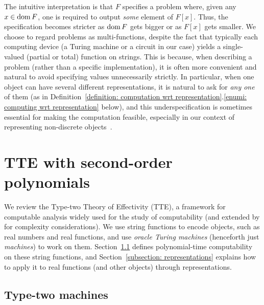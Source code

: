 \documentclass[conference]{IEEEtran}
\newcommand{\dom}{\mathop{\rm dom}}
\theoremstyle{definition}
\theoremstyle{remark}
\newcommand{\pcolon}{\mathpunct{\,:\subseteq}}
\begin{document}
The intuitive interpretation is that 
$F$ specifies a problem where, 
given any $x \in \dom F$, 
one is required to output \emph{some} element of $F [x]$. 
Thus, the specification 
becomes stricter
as $\dom F$ gets bigger or as $F [x]$ gets smaller. 
We choose to regard problems as multi-functions, 
despite the fact that typically each computing device 
(a Turing machine or a circuit in our case) 
yields a single-valued (partial or total) function on strings. 
This is because, 
when describing a problem (rather than a specific implementation), 
it is often more convenient and natural to 
avoid specifying values unnecessarily strictly. 
In particular, 
when one object can have several different representations, 
it is natural to ask for \emph{any one} of them
(as in Definition~\ref{definition: computation wrt representation}.\ref{enumi: computing wrt representation} below), 
and this underspecification is 
sometimes essential for making the computation feasible, 
especially in our context of representing non-discrete objects~\cite{bhw}. 


\section{TTE with second-order polynomials}
\label{section: computable analysis}

We review the Type-two Theory of Effectivity (TTE), 
a framework for computable analysis 
widely used for the study of computability \cite{weihrauch00:_comput_analy}
(and extended by \cite{kawamura2012complexity} 
for complexity considerations). 
We use string functions to 
encode objects, such as real numbers and real functions, 
and use \emph{oracle Turing machines} (henceforth just \emph{machines}) 
to work on them.
Section~\ref{section:TTF} defines polynomial-time computability on 
these string functions, 
and Section~\ref{subsection: representations} explains how to 
apply it to real functions (and other objects) through representations. 

\subsection{Type-two machines}
\label{section:TTF}
\end{document}
